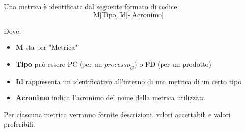Una metrica è identificata dal seguente formato di codice:
\[
\text{M[Tipo][Id]-[Acronimo]}
\]

Dove:
\begin{itemize}
    \item \textbf{M} sta per "Metrica"
    \item \textbf{Tipo} può essere PC (per un $\textit{processo}_G$) o PD (per un prodotto)
    \item \textbf{Id} rappresenta un identificativo all'interno di una metrica di un certo tipo
    \item \textbf{Acronimo} indica l'acronimo del nome della metrica utilizzata
\end{itemize}

Per ciascuna metrica verranno fornite descrizioni, valori accettabili e valori preferibili.